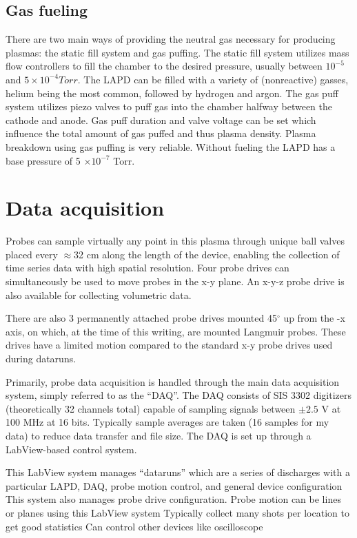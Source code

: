 \subsection{Gas fueling}
There are two main ways of providing the neutral gas necessary for producing plasmas: the static fill system and gas puffing. The static fill system utilizes mass flow controllers to fill the chamber to the desired pressure, usually between $10^{-5}$ and $5 \times 10^{-4} Torr$. The LAPD can be filled with a variety of (nonreactive) gasses, helium being the most common, followed by hydrogen and argon. The gas puff system utilizes piezo valves to puff gas into the chamber halfway between the cathode and anode. Gas puff duration and valve voltage can be set which influence the total amount of gas puffed and thus plasma density. Plasma  breakdown using gas puffing is very reliable. Without fueling the LAPD has a base pressure of 5 $\times 10^{-7}$ Torr. 

\section{Data acquisition}

Probes can sample virtually any point in this plasma through unique ball valves placed every $\approx$32 cm along the length of the device, enabling the collection of time series data with high spatial resolution. Four probe drives can simultaneously be used to move probes in the x-y plane. An x-y-z probe drive is also available for collecting volumetric data. 

There are also 3 permanently attached probe drives mounted 45$^\circ$ up from the -x axis, on which, at the time of this writing, are mounted Langmuir probes. These drives have a limited motion compared to the standard x-y probe drives used during dataruns.

Primarily, probe data acquisition is handled through the main data acquisition system, simply referred to as the ``DAQ''. The DAQ consists of SIS 3302 digitizers (theoretically 32 channels total) capable of sampling signals between $\pm 2.5$ V at 100 MHz at 16 bits. Typically sample averages are taken (16 samples for my data) to reduce data transfer and file size. The DAQ is set up through a LabView-based control system. 

This LabView system manages ``dataruns''
which are a series of discharges with a particular LAPD, DAQ, probe motion control, and general device configuration
This system also manages probe drive configuration. Probe motion can be lines or planes using this LabView system
Typically collect many shots per location to get good statistics
Can control other devices like oscilloscope


